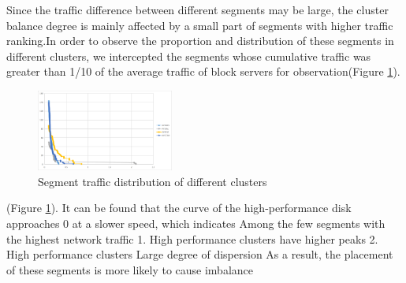 Since the traffic difference between different segments may be large, the cluster balance degree is mainly affected by a small part of segments with higher traffic ranking.In order to observe the proportion and distribution of these segments in different clusters, we intercepted the segments whose cumulative traffic was greater than 1/10 of the average traffic of block servers for observation(Figure \ref{fig3-4}).
\begin{figure}[ht]
    \centering
    \includegraphics[width=0.4\textwidth]{Figure-3.1/Figure_3-3.png}
    \caption{Segment traffic distribution of different clusters}
    \label{fig3-4}
\end{figure}
(Figure \ref{fig3-4}).
It can be found that the curve of the high-performance disk approaches 0 at a slower speed, which indicates Among the few segments with the highest network traffic 
1. High performance clusters have higher peaks
2. High performance clusters Large degree of dispersion
As a result, the placement of these segments is more likely to cause imbalance